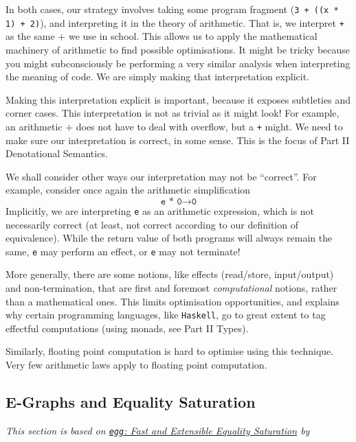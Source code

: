 In both cases, our strategy involves taking some program fragment (\texttt{3 + ((x * 1) + 2)}), and interpreting it in the theory of arithmetic. That is, we interpret \texttt{+} as the same $+$ we use in school. This allows us to apply the mathematical machinery of arithmetic to find possible optimisations. It might be tricky because you might subconsciously be performing a very similar analysis when interpreting the meaning of code. We are simply making that interpretation explicit.

Making this interpretation explicit is important, because it exposes subtleties and corner cases. This interpretation is not as trivial as it might look! For example, an arithmetic $+$ does not have to deal with overflow, but a \texttt{+} might. We need to make sure our interpretation is correct, in some sense. This is the focus of \textsf{Part II Denotational Semantics}. 

We shall consider other ways our interpretation may not be ``correct''. For example, consider once again the arithmetic simplification
\[\texttt{e * 0} \to \texttt{0}\]
Implicitly, we are interpreting \texttt{e} as an arithmetic expression, which is not {necessarily correct} (at least, not correct according to our definition of equivalence). While the return value of both programs will always remain the same, \texttt{e} may perform an effect, or \texttt{e} may not terminate!

More generally, there are some notions, like effects (read/store, input/output) and non-termination, that are first and foremost \textit{computational} notions, rather than a mathematical ones. This limits optimisation opportunities, and explains why certain programming languages, like \texttt{Haskell}, go to great extent to tag effectful computations (using monads, see \textsf{Part II Types}).

Similarly, floating point computation is hard to optimise using this technique. Very few arithmetic laws apply to floating point computation.

\subsection{E-Graphs and Equality Saturation \optional}
\textit{This section is based on \href{https://dl.acm.org/doi/pdf/10.1145/3434304}{\texttt{egg}: Fast and Extensible Equality Saturation} by} \citet{willsey-2021}

